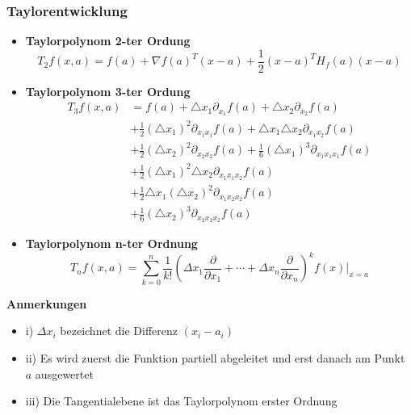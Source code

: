 \documentclass[8pt, a4paper, landscape, fleqn]{scrartcl}
\newenvironment {annotation}[1]
				{\begin{itshape} \begin{small} \textbf{#1} \begin{itemize}}
				{\end{itemize} \end{small} \end{itshape}}
\begin{document}
\begin{multicols*}{3}
				\subsubsection{Taylorentwicklung}
					\begin{itemize}
						\item \textbf{Taylorpolynom 2-ter Ordung}
						\begin{equation*}
							T_{2}f(x, a)=f(a)+\nabla f(a)^T(x-a)+\frac{1}{2}(x-a)^TH_f(a)(x-a)
						\end{equation*}
						\item \textbf{Taylorpolynom 3-ter Ordung}
						\begin{align*}
							T_{3}f(x, a)&=f(a)+ \triangle x_1 \partial_{x_1}f(a) + \triangle x_2 \partial_{x_2} f(a)\\
							&+ \frac{1}{2}(\triangle x_1)^2 \partial_{x_1 x_1} f(a) + \triangle x_1\triangle x_2 \partial_{x_1 x_2} f(a) \\
							&+ \frac{1}{2}(\triangle x_2)^2 \partial_{x_2 x_2} f(a)+ \frac{1}{6}(\triangle x_1)^3 \partial_{x_1 x_1 x_1} f(a)\\
							&+ \frac{1}{2} (\triangle x_1)^2 \triangle x_2 \partial_{x_1 x_1 x_2} f(a)\\
							&+ \frac{1}{2} \triangle x_1 (\triangle x_2)^2 \partial_{x_1 x_2 x_2} f(a)\\
							&+ \frac{1}{6}(\triangle x_2)^3 \partial_{x_2 x_2 x_2} f(a)
						\end{align*}
						\item \textbf{Taylorpolynom n-ter Ordnung}
							\begin{equation*}
								T_nf(x, a)=\sum_{k=0}^{n} \frac{1}{k!}\left(\Delta x_1 \frac{\partial}{\partial x_1}+\cdots+\Delta x_n \frac{\partial}{\partial x_n}\right)^kf(x)\Bigg|_{x=a}
							\end{equation*}
					\end{itemize}
					\begin{annotation}{Anmerkungen}
						\item [i)] $\Delta x_i$ bezeichnet die Differenz $(x_i-a_i)$
						\item [ii)] Es wird zuerst die Funktion partiell abgeleitet und erst danach am Punkt $a$ ausgewertet
						\item [iii)] Die Tangentialebene ist das Taylorpolynom erster Ordnung 
					\end{annotation}
					

\end{multicols*}
\end{document}
